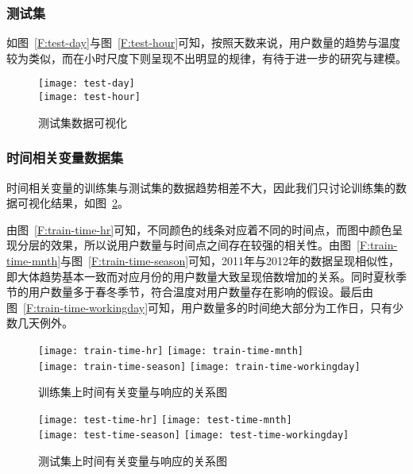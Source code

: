 \subsubsection{测试集}
如图~\ref{F:test-day}与图~\ref{F:test-hour}可知，按照天数来说，用户数量的趋势与温度较为类似，而在小时尺度下则呈现不出明显的规律，有待于进一步的研究与建模。
\begin{figure}[htbp]
    \centering
    \cprotect{}
        {\texttt{[image: test-day]}} \\
    \cprotect{}
        {\texttt{[image: test-hour]}}
    \caption{测试集数据可视化}\label{F:test}
\end{figure}

\subsubsection{时间相关变量数据集}
时间相关变量的训练集与测试集的数据趋势相差不大，因此我们只讨论训练集的数据可视化结果，如图~\ref{F:train-time}。

由图~\ref{F:train-time-hr}可知，不同颜色的线条对应着不同的时间点，而图中颜色呈现分层的效果，所以说用户数量与时间点之间存在较强的相关性。由图~\ref{F:train-time-mnth}与图~\ref{F:train-time-season}可知，2011年与2012年的数据呈现相似性，即大体趋势基本一致而对应月份的用户数量大致呈现倍数增加的关系。同时夏秋季节的用户数量多于春冬季节，符合温度对用户数量存在影响的假设。最后由图~\ref{F:train-time-workingday}可知，用户数量多的时间绝大部分为工作日，只有少数几天例外。
\begin{figure}[htbp]
    \centering
        {\texttt{[image: train-time-hr]}}
        {\texttt{[image: train-time-mnth]}} \\
        {\texttt{[image: train-time-season]}}
        {\texttt{[image: train-time-workingday]}}
    \caption{训练集上时间有关变量与响应的关系图}\label{F:train-time}
\end{figure}

\begin{figure}[htbp]
    \centering
        {\texttt{[image: test-time-hr]}}
        {\texttt{[image: test-time-mnth]}} \\
        {\texttt{[image: test-time-season]}}
        {\texttt{[image: test-time-workingday]}}
    \caption{测试集上时间有关变量与响应的关系图}\label{F:test-time}
\end{figure}
